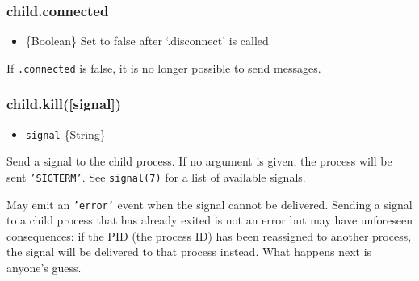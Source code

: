 \subsubsection{child.connected}\label{child.connected}

\begin{itemize}
\itemsep1pt\parskip0pt
\item
  \{Boolean\} Set to false after `.disconnect' is called
\end{itemize}

If \texttt{.connected} is false, it is no longer possible to send
messages.

\subsubsection{child.kill({[}signal{]})}\label{child.killsignal}

\begin{itemize}
\itemsep1pt\parskip0pt
\item
  \texttt{signal} \{String\}
\end{itemize}

Send a signal to the child process. If no argument is given, the process
will be sent \texttt{'SIGTERM'}. See \texttt{signal(7)} for a list of
available signals.

\begin{Shaded}
\begin{Highlighting}[]
 \NormalTok{(}\NormalTok{,}
    \NormalTok{(}\NormalTok{, [}\NormalTok{]);}

\NormalTok{(}\NormalTok{, } 
  \NormalTok{(}
\NormalTok{\});}

\NormalTok{(}\NormalTok{);}
\end{Highlighting}
\end{Shaded}

May emit an \texttt{'error'} event when the signal cannot be delivered.
Sending a signal to a child process that has already exited is not an
error but may have unforeseen consequences: if the PID (the process ID)
has been reassigned to another process, the signal will be delivered to
that process instead. What happens next is anyone's guess.

